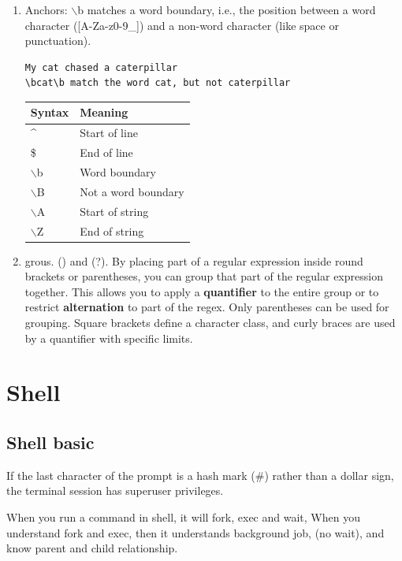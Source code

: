 \documentclass[paper=8.5in:11in, twoside, 12pt, pagesize=pdftex]{book}
\begin{document}
\begin{enumerate}
	\item Anchors: $\backslash$b matches a word boundary, i.e., the position between a word character ([A-Za-z0-9\_]) and a non-word character (like space or punctuation).
\begin{lstlisting}
My cat chased a caterpillar 
\bcat\b match the word cat, but not caterpillar
\end{lstlisting}
	\begin{tabular}{|l|l|}
		\hline
		\textbf{Syntax} & \textbf{Meaning} \\
		\hline
		\hline \textasciicircum       & Start of line \\
		\hline \$       & End of line \\
		\hline $\backslash$b       & Word boundary \\
		\hline $\backslash$B       & Not a word boundary \\
		\hline $\backslash$A       & Start of string \\
		\hline $\backslash$Z       & End of string \\
		\hline
	\end{tabular}
	
	\item grous. () and (?). By placing part of a regular expression inside round brackets or parentheses, you can group that part of the regular expression together. This allows you to apply a \textbf{quantifier} to the entire group or to restrict \textbf{alternation} to part of the regex.  Only parentheses can be used for grouping. Square brackets define a character class, and curly braces are used by a quantifier with specific limits.	
\end{enumerate}


\section{Shell}

\subsection{Shell basic}

	If the last character of the prompt is a hash mark (\#) rather than a dollar sign, the terminal session has superuser privileges.

	\par When you run a command in shell, it will fork, exec and wait, When you understand fork and exec, then it understands background job, (no wait), and know parent and child relationship. 
	
\end{document}
